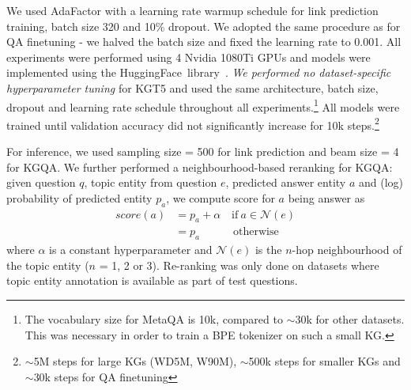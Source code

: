 \documentclass[11pt]{article}
\renewcommand\:{\colon} \newcommand{\sset}[1]{\left\{\,#1\,\right\}} \newcommand{\ssets}[1]{\left\{#1\right\}} \newcommand{\ssetn}[1]{\{\,#1\,\}}
\newcommand\cN{\mathcal{N}}
\newcommand{\method}{\textsc{KGT5}}
\begin{document}
We used AdaFactor \cite{shazeer2018adafactor} with a learning rate warmup schedule for link prediction training, batch size 320 and 10\% dropout. We adopted the same procedure as \citet{roberts-etal-2020-much} for QA finetuning - we halved the batch size and fixed the learning rate to 0.001. All experiments were performed using 4 Nvidia 1080Ti GPUs and models were implemented using the HuggingFace~library~\cite{huggingface}. \textit{We performed no dataset-specific hyperparameter tuning} for \method{} and used the same architecture, batch size, dropout and learning rate schedule throughout all experiments.\footnote{The vocabulary size for MetaQA is 10k, compared to $\sim$30k for other datasets. This was necessary in order to train a BPE tokenizer on such a small KG.}
All models were trained until validation accuracy did not significantly increase for 10k steps.\footnote{$\sim$5M steps for large KGs (WD5M, W90M), $\sim$500k steps for smaller KGs and $\sim$30k steps for QA finetuning}

For inference, we used sampling size = 500 for link prediction and beam size = 4 for KGQA. We further performed a neighbourhood-based reranking for KGQA: given question $q$, topic entity from question $e$, predicted answer entity $a$ and (log) probability of predicted entity $p_a$, we compute score for $a$ being answer as
\begin{equation}
\begin{aligned}
    score(a) &= p_a + \alpha \quad \mathrm{if} \  a \in \cN(e)  \\
     &= p_a \qquad \quad \mathrm{otherwise}
\end{aligned}
\end{equation}
where $\alpha$ is a constant hyperparameter and $\cN(e)$ is the $n$-hop neighbourhood of the topic entity ($n$ = 1, 2 or 3). 
Re-ranking was only done on datasets where topic entity annotation is available as part of test questions.
\end{document}
